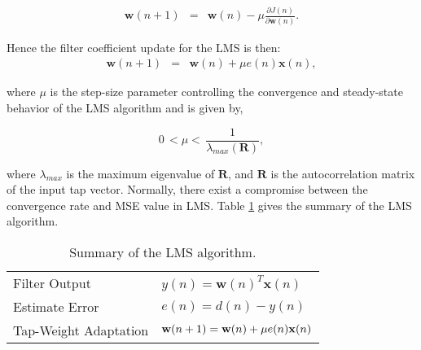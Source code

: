 \vspace{-0.3cm}
\begin{eqnarray}
\nonumber
\textbf{w}(n+1)&=&\textbf{w}(n)-\mu\frac{\partial J(n)}{\partial\textbf{w}(n)}. \label{eq3b}
\end{eqnarray}

\vspace{-0.6cm}
\noindent Hence the filter coefficient update for the LMS is then:
\vspace{-0.6cm}
\begin{eqnarray}
\textbf{w}(n+1)&=&\textbf{w}(n)+\mu e(n)\textbf{x}(n),\label{eq4b}
\end{eqnarray}

\vspace{-0.8cm}
\noindent where $\mu$ is the step-size parameter controlling the convergence and steady-state behavior of the LMS algorithm and is given by,

\vspace{-1.5cm}
\begin{equation}
0\hspace{2pt}<\mu<\hspace{2pt}\frac{1}{\lambda_{max}(\textbf{R})}, \label{eq5b}
\end{equation}

\vspace{-0.8cm}
\noindent where $\lambda_{max}$ is the maximum eigenvalue of $\textbf{R}$, and $\textbf{R}$ is the autocorrelation matrix of the input tap vector.
Normally, there exist a compromise between the convergence rate and MSE value in LMS. Table \ref{table:1} gives the summary of the LMS algorithm.

\begin{table}[ht]
\caption{Summary of the LMS algorithm.}
\vspace{0.5cm}
\centering
\begin{tabular}{ll}
\hline
\hline
 Filter Output  & $y(n)=\textbf{w}(n)^{T}\textbf{x}(n)$\\
 Estimate Error  & $e(n)=d(n)-y(n)$\\
 Tap-Weight Adaptation & $\textbf{w}(n+1)=\textbf{w}(n)+\mu e(n)\textbf{\textbf{x}}(n)$ \\
 \hline
 \end{tabular}
\label{table:1} %
\end{table}

